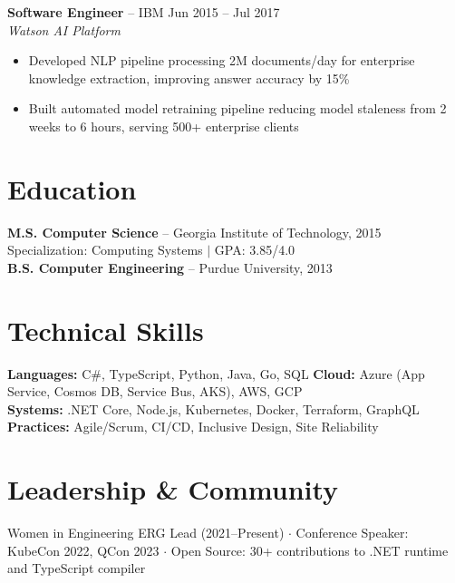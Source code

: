 \documentclass[10pt,letterpaper]{article}
\begin{document}
{\bfseries Software Engineer} -- IBM \hfill {\footnotesize\color{accent} Jun 2015 -- Jul 2017}\\[-2pt]
{\footnotesize\itshape Watson AI Platform}
\begin{itemize}
    \item Developed NLP pipeline processing 2M documents/day for enterprise knowledge extraction, improving answer accuracy by 15\%
    \item Built automated model retraining pipeline reducing model staleness from 2 weeks to 6 hours, serving 500+ enterprise clients
\end{itemize}

\section{Education}

{\bfseries M.S. Computer Science} -- Georgia Institute of Technology, 2015 \hfill {\footnotesize Specialization: Computing Systems $\mid$ GPA: 3.85/4.0}\\
{\bfseries B.S. Computer Engineering} -- Purdue University, 2013

\section{Technical Skills}

{\footnotesize
\textbf{Languages:} C\#, TypeScript, Python, Java, Go, SQL \quad \textbf{Cloud:} Azure (App Service, Cosmos DB, Service Bus, AKS), AWS, GCP\\
\textbf{Systems:} .NET Core, Node.js, Kubernetes, Docker, Terraform, GraphQL \quad \textbf{Practices:} Agile/Scrum, CI/CD, Inclusive Design, Site Reliability}

\section{Leadership \& Community}

{\footnotesize Women in Engineering ERG Lead (2021--Present) $\cdot$ Conference Speaker: KubeCon 2022, QCon 2023 $\cdot$ Open Source: 30+ contributions to .NET runtime and TypeScript compiler}
\end{document}

